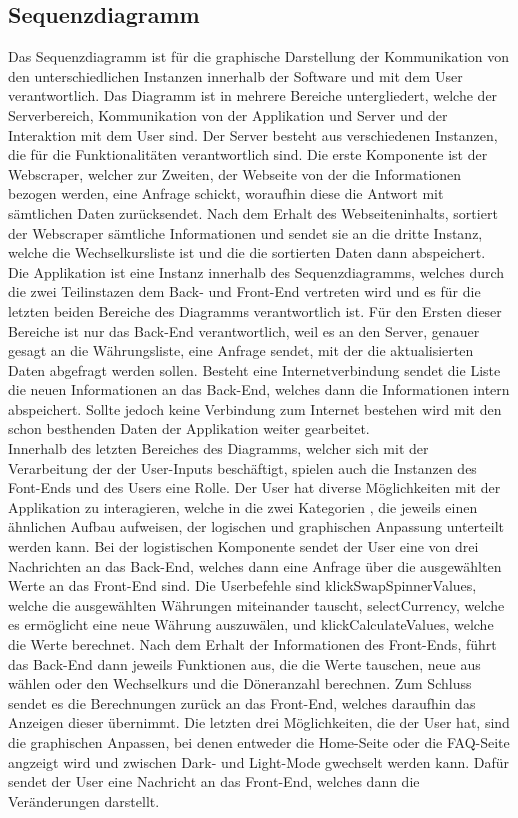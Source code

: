 \documentclass[conference]{IEEEtran}
\begin{document}
\subsection{Sequenzdiagramm}
Das Sequenzdiagramm ist für die graphische Darstellung der Kommunikation von den unterschiedlichen Instanzen innerhalb der Software und mit dem User verantwortlich. 
Das Diagramm ist in mehrere Bereiche untergliedert, welche der Serverbereich, Kommunikation von der Applikation und Server und der Interaktion mit dem User sind.
Der Server besteht aus verschiedenen Instanzen, die für die Funktionalitäten verantwortlich sind. Die erste Komponente ist der Webscraper, welcher zur Zweiten, der Webseite von der die Informationen bezogen werden, eine Anfrage schickt, woraufhin diese die Antwort mit sämtlichen Daten zurücksendet. Nach dem Erhalt des Webseiteninhalts, sortiert der Webscraper sämtliche Informationen und sendet sie an die dritte Instanz, welche die Wechselkursliste ist und die die sortierten Daten dann abspeichert.\\
Die Applikation ist eine Instanz innerhalb des Sequenzdiagramms, welches durch die zwei Teilinstazen dem Back- und Front-End vertreten wird und es für die letzten beiden Bereiche des Diagramms verantwortlich ist. Für den Ersten dieser Bereiche ist nur das Back-End verantwortlich, weil es an den Server, genauer gesagt an die Währungsliste, eine Anfrage sendet, mit der die aktualisierten Daten abgefragt werden sollen. Besteht eine Internetverbindung sendet die Liste die neuen Informationen an das Back-End, welches dann die Informationen intern abspeichert. Sollte jedoch keine Verbindung zum Internet bestehen wird mit den schon besthenden Daten der Applikation weiter gearbeitet.\\
Innerhalb des letzten Bereiches des Diagramms, welcher sich mit der Verarbeitung der der User-Inputs beschäftigt, spielen auch die Instanzen des Font-Ends und des Users eine Rolle. Der User hat diverse Möglichkeiten mit der Applikation zu interagieren, welche in die zwei Kategorien , die jeweils einen ähnlichen Aufbau aufweisen, der logischen und graphischen Anpassung unterteilt werden kann.  Bei der logistischen Komponente sendet der User eine von drei Nachrichten an das Back-End, welches dann eine Anfrage über die ausgewählten Werte an das Front-End sind. Die Userbefehle sind klickSwapSpinnerValues, welche die ausgewählten Währungen miteinander tauscht, selectCurrency, welche es ermöglicht eine neue Währung auszuwälen, und klickCalculateValues, welche die Werte berechnet. Nach dem Erhalt der Informationen des Front-Ends, führt das Back-End dann jeweils Funktionen aus, die die Werte tauschen, neue aus wählen oder den Wechselkurs und die Döneranzahl berechnen. Zum Schluss sendet es die Berechnungen zurück an das Front-End, welches daraufhin das Anzeigen dieser übernimmt. Die letzten drei Möglichkeiten, die der User hat, sind die graphischen Anpassen, bei denen entweder die Home-Seite  oder die FAQ-Seite angzeigt wird und zwischen Dark- und Light-Mode gwechselt werden kann. Dafür sendet der User eine Nachricht an das Front-End, welches dann die Veränderungen darstellt.
\end{document}
